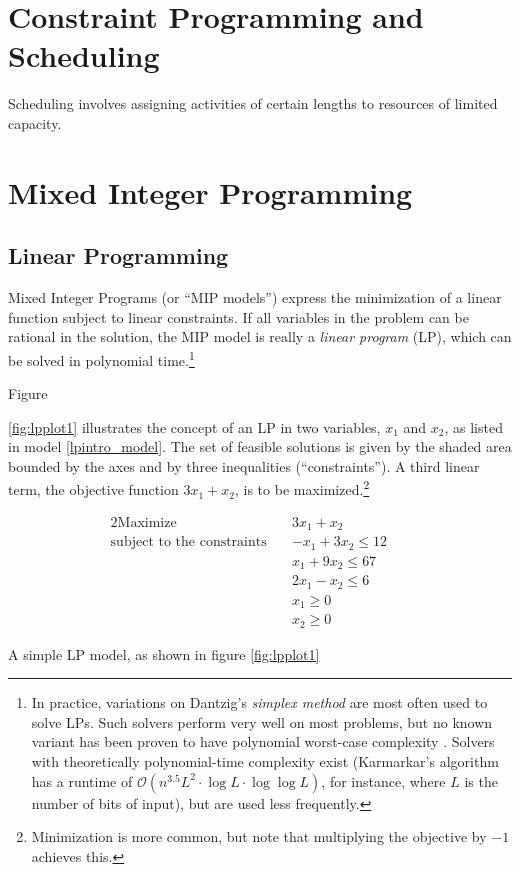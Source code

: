 \documentclass[13pt, letterpaper, oneside]{book}
\begin{document}
\section{Constraint Programming and Scheduling}

Scheduling involves assigning activities of certain lengths to resources of
limited capacity.

\section{Mixed Integer Programming}
\subsection{Linear Programming}
Mixed Integer Programs (or ``MIP
models'') express the minimization of a linear function subject to linear
constraints. If all variables in the problem can be rational in the solution,
the MIP model is really a \textit{linear program} (LP), which can be solved in
polynomial time.\footnote{In practice, variations on Dantzig's \textit{simplex
method} are most often used to solve LPs. Such solvers perform very well on most
problems, but no known variant has been proven to have polynomial worst-case
complexity \citep{papadimitriou}. Solvers with theoretically polynomial-time
complexity exist (Karmarkar's algorithm \citet{karmarkar} has a runtime of
$\mathcal{O}(n^{3.5}L^2 \cdot \log L \cdot \log \log L)$, for instance, where
$L$ is the number of bits of input), but are used less frequently.}

Figure

\ref{fig:lpplot1} illustrates the concept of an LP in two variables, $x_1$ and
$x_2$, as listed in model \ref{lpintro_model}. The set of feasible solutions is given by the shaded area bounded by the axes
and by three inequalities (``constraints''). A third linear term, the objective
function $3x_1 + x_2$, is to be maximized.\footnote{Minimization is more common,
but note that multiplying the objective by $-1$ achieves this.} 
\begin{model}
\begin{alignat}{2}
\text{Maximize}\quad & 3x_1 + x_2 && \\
\text{subject to the constraints}\quad & -x_1 + 3x_2 \leq 12 &&\\
& x_1 + 9x_2 \leq 67 && \\
& 2x_1 - x_2 \leq 6 && \\
& x_1 \geq 0 && \\
& x_2 \geq 0 && 
\end{alignat}
\caption{A simple LP model, as shown in figure \ref{fig:lpplot1}}
\label{lpintro_model}
\end{model}
\end{document}
